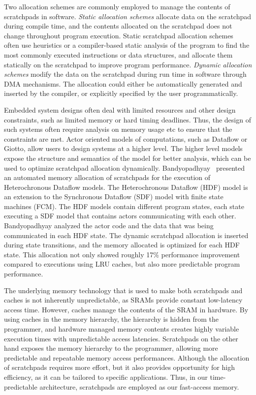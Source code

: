Two allocation schemes are commonly employed to manage the contents of scratchpads in software.
\emph{Static allocation schemes} allocate data on the scratchpad during compile time, and the contents allocated on the scratchpad does not change throughout program execution. 
Static scratchpad allocation schemes~\cite{Suhendra2005WCETSPM, Patel2008PRETSPM} often use heuristics or a compiler-based static analysis of the program to find the most commonly executed instructions or data structures, and allocate them statically on the scratchpad to improve program performance. 
\emph{Dynamic allocation schemes} modify the data on the scratchpad during run time in software through DMA mechanisms.
The allocation could either be automatically generated and inserted by the compiler, or explicitly specified by the user programmatically.

Embedded system designs often deal with limited resources and other design constraints, such as limited memory or hard timing deadlines.    
Thus, the design of such systems often require analysis on memory usage etc to ensure that the constraints are met. 
Actor oriented models of computations, such as Dataflow or Giotto, allow users to design systems at a higher level.
The higher level models expose the structure and semantics of the model for better analysis, which can be used to optimize scratchpad allocation dynamically.
Bandyopadhyay~\cite{Bandyopadhyay06_AutomatedMemoryAllocationOfActorCodeDataBufferInHeterochronous} presented an automated memory allocation of scratchpads for the execution of Heterochronous Dataflow models.
The Heterochronous Dataflow (HDF) model is an extension to the Synchronous Dataflow (SDF) model with finite state machines (FCM). 
The HDF models contain different program states, each state executing a SDF model that contains actors communicating with each other. 
Bandyopadhyay analyzed the actor code and the data that was being communicated in each HDF state.
The dynamic scratchpad allocation is inserted during state transitions, and the memory allocated is optimized for each HDF state. 
This allocation not only showed roughly 17\% performance improvement compared to executions using LRU caches, but also more predictable program performance.

The underlying memory technology that is used to make both scratchpads and caches is not inherently unpredictable, as SRAMs provide constant low-latency access time. 
However, caches manage the contents of the SRAM in hardware. 
By using caches in the memory hierarchy, the hierarchy is hidden from the programmer, and hardware managed memory contents creates highly variable execution times with unpredictable access latencies. 
Scratchpads on the other hand exposes the memory hierarchy to the programmer, allowing more predictable and repeatable memory access performances.
Although the allocation of scratchpads requires more effort, but it also provides opportunity for high efficiency, as it can be tailored to specific applications.   
Thus, in our time-predictable architecture, scratchpads are employed as our fast-access memory. 

